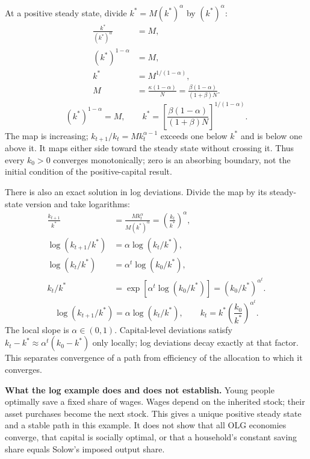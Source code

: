 At a positive steady state, divide $k^*=M(k^*)^\alpha$ by $(k^*)^\alpha$:
\begin{align}
\frac{k^*}{(k^*)^\alpha}&=M,\\
(k^*)^{1-\alpha}&=M,\\
k^*&=M^{1/(1-\alpha)},\\
M&=\frac{\kappa(1-\alpha)}{N}
   =\frac{\beta(1-\alpha)}{(1+\beta)N}.
\end{align}
\begin{equation}\label{eq:olg-log-steady}
(k^*)^{1-\alpha}=M,\qquad
k^*=\left[\frac{\beta(1-\alpha)}{(1+\beta)N}\right]^{1/(1-\alpha)}.
\end{equation}
The map is increasing; $k_{t+1}/k_t=Mk_t^{\alpha-1}$ exceeds one below $k^*$
and is below one above it. It maps either side toward the steady state without
crossing it. Thus every $k_0>0$ converges monotonically; zero is an absorbing
boundary, not the initial condition of the positive-capital result.

There is also an exact solution in log deviations. Divide the map by its
steady-state version and take logarithms:
\begin{align}
\frac{k_{t+1}}{k^*}
 &=\frac{Mk_t^\alpha}{M(k^*)^\alpha}
  =\left(\frac{k_t}{k^*}\right)^\alpha,\\
\log(k_{t+1}/k^*)&=\alpha\log(k_t/k^*),\\
\log(k_t/k^*)&=\alpha^t\log(k_0/k^*),\\
k_t/k^*&=\exp[\alpha^t\log(k_0/k^*)]
        =(k_0/k^*)^{\alpha^t}.
\end{align}
\begin{equation}
\log(k_{t+1}/k^*)=\alpha\log(k_t/k^*),\qquad
k_t=k^*\left(\frac{k_0}{k^*}\right)^{\alpha^t}.
\end{equation}
The local slope is $\alpha\in(0,1)$. Capital-level deviations satisfy
$k_t-k^*\approx\alpha^t(k_0-k^*)$ only locally; log deviations decay exactly
at that factor. This separates convergence of a path from efficiency of the
allocation to which it converges.

\begin{greenblock}
\textbf{What the log example does and does not establish.}
Young people optimally save a fixed share of wages. Wages depend on the
inherited stock; their asset purchases become the next stock. This gives a
unique positive steady state and a stable path in this example. It does not
show that all OLG economies converge, that capital is socially optimal, or
that a household's constant saving share equals Solow's imposed output share.
\end{greenblock}

